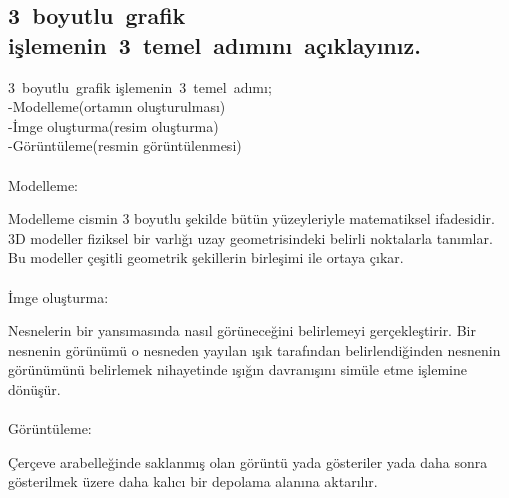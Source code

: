 \documentclass[12pt]{article}
\begin{document}
\subsection{3 boyutlu grafik işlemenin 3 temel adımını açıklayınız.}
3 boyutlu grafik işlemenin 3 temel adımı;\\	
-Modelleme(ortamın oluşturulması)	\\
-İmge oluşturma(resim oluşturma)\\
-Görüntüleme(resmin görüntülenmesi)\\
\\Modelleme:\par
Modelleme cismin 3 boyutlu şekilde bütün yüzeyleriyle matematiksel ifadesidir.
3D modeller fiziksel bir varlığı uzay geometrisindeki belirli noktalarla tanımlar.
Bu modeller çeşitli geometrik şekillerin birleşimi ile ortaya çıkar.\\
\\İmge oluşturma:\par
Nesnelerin bir yansımasında nasıl görüneceğini belirlemeyi gerçekleştirir.
Bir nesnenin görünümü o nesneden yayılan ışık tarafından belirlendiğinden nesnenin görünümünü
belirlemek nihayetinde ışığın davranışını simüle etme işlemine dönüşür.\\
\\Görüntüleme:\par
Çerçeve arabelleğinde saklanmış olan görüntü yada gösteriler  yada daha sonra gösterilmek
üzere daha kalıcı bir depolama alanına aktarılır.
\end{document}
